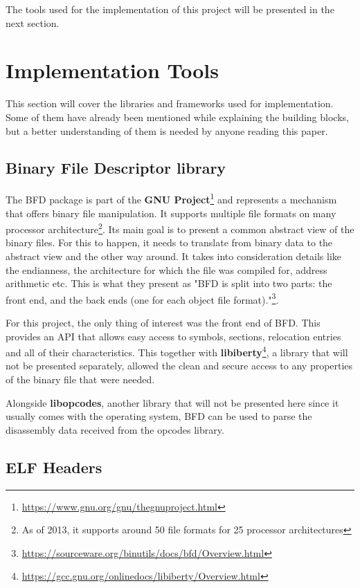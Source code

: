 The tools used for the implementation of this project will be presented in the next section.

\section{Implementation Tools}
\label{sec:imp-tools}

This section will cover the libraries and frameworks used for implementation. Some of them have already been mentioned while explaining the building blocks, but a better understanding of them is needed by anyone reading this paper.

\subsection{Binary File Descriptor library}
\label{sub-sec:bfd}

The BFD package is part of the \textbf{GNU Project}\footnote{\url{https://www.gnu.org/gnu/thegnuproject.html}} and represents a mechanism that offers binary file manipulation. It supports multiple file formats on many processor architecture\footnote{As of 2013, it supports around 50 file formats for 25 processor architectures}. Its main goal is to present a common abstract view of the binary files. For this to happen, it needs to translate from binary data to the abstract view and the other way around. It takes into consideration details like the endianness, the architecture for which the file was compiled for, address arithmetic etc. This is what they present as "BFD is split into two parts: the front end, and the back ends (one for each object file format)."\footnote{\url{https://sourceware.org/binutils/docs/bfd/Overview.html}}.

For this project, the only thing of interest was the front end of BFD. This provides an API that allows easy access to symbols, sections, relocation entries and all of their characteristics. This together with \textbf{libiberty}\footnote{\url{https://gcc.gnu.org/onlinedocs/libiberty/Overview.html}}, a library that will not be presented separately, allowed the clean and secure access to any properties of the binary file that were needed.

Alongside \textbf{libopcodes}, another library that will not be presented here since it usually comes with the operating system, BFD can be used to parse the disassembly data received from the opcodes library.

\subsection{ELF Headers}
\label{sub-sec:elf-headers}

